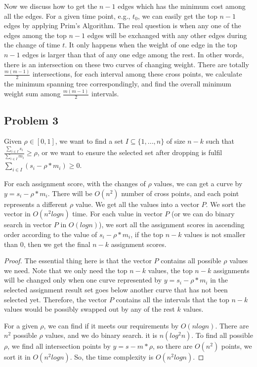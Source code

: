 \documentclass[paper=a4, fontsize=11pt]{scrartcl} %
\numberwithin{equation}{section} %
\numberwithin{figure}{section} %
\numberwithin{table}{section} %
\begin{document}
Now we discuss how to get the $n-1$ edges which has the minimum cost among all the edges. For a given time point, e.g., $t_0$, we can easily get the top $n-1$ edges by applying Prim's Algorithm. The real question is when any one of the edges among the top $n-1$ edges will be exchanged with any other edges during the change of time $t$. It only happens when the weight of one edge in the top $n-1$ edges is larger than that of any one edge among the rest. In other words, there is an intersection on these two curves of changing weight. There are totally $\frac{m(m-1)}{2}$ intersections, for each interval among these cross points, we calculate the minimum spanning tree correspondingly, and find the overall minimum weight sum among $\frac{m(m-1)}{2}$ intervals. 


\subsection*{Problem 3}



Given $\rho \in [0, 1]$, we want to find a set $I \subseteq \{1,...,n\}$ of size $n-k$ such that $\frac{\sum_{i \in I}{s_i}}{\sum_{i \in I}{m_i}} \geq \rho$, or we want to ensure the selected set after dropping is fulfil $\sum_{i \in I}(s_i - \rho * m_i) \geq 0$. 


For each assignment score, with the changes of $\rho$ values, we can get a curve by $y = s_i - \rho * m_i$. There will be $O(n^2)$ number of cross points, and each point represents a different $\rho$ value.
We get all the values into a vector $P$. We sort the vector in $O(n^2logn)$ time. For each value in vector $P$ (or we can do binary search in vector $P$ in $O(logn)$), we sort all the assignment scores in ascending order according to the value of $s_i - \rho * m_i$, if the top $n-k$ values is not smaller than $0$, then we get the final $n-k$ assignment scores. 

\begin{proof}

The essential thing here is that the vector $P$ contains all possible $\rho$ values we need. Note that we only need the top $n-k$ values, the top $n-k$ assignments will be changed only when one curve represented by $y = s_i - \rho * m_i$ in the selected assignment result set goes below another curve that has not been selected yet. Therefore, the vector $P$ contains all the intervals that the top $n-k$ values would be possibly swapped out by any of the rest $k$ values. 

For a given $\rho$, we can find if it meets our requirements by $O(nlogn)$. There are $n^2$ possible $\rho$ values, and we do binary search. it is $n(log^2n)$. To find all possible $\rho$, we find all intersection points by $y = s - m * \rho$, so there are $O(n^2)$ points, we sort it in $O(n^2logn)$. So, the time complexity is $O(n^2logn)$.


\end{proof}
\end{document}
